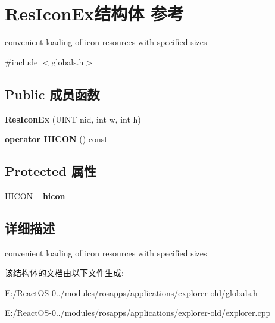 \hypertarget{struct_res_icon_ex}{}\section{Res\+Icon\+Ex结构体 参考}
\label{struct_res_icon_ex}


convenient loading of icon resources with specified sizes  




{\ttfamily \#include $<$globals.\+h$>$}

\subsection*{Public 成员函数}
\begin{DoxyCompactItemize}
\item 
\mbox{\label{struct_res_icon_ex_ac95a1940089c74b35853ab9e242a7ad2}} 
{\bfseries Res\+Icon\+Ex} (U\+I\+NT nid, int w, int h)
\item 
\mbox{\label{struct_res_icon_ex_ab31f198cd26556f03fb1fc600f46fc13}} 
{\bfseries operator H\+I\+C\+ON} () const
\end{DoxyCompactItemize}
\subsection*{Protected 属性}
\begin{DoxyCompactItemize}
\item 
\mbox{\label{struct_res_icon_ex_ab12ca56389f9d780749e4e1d7defa9af}} 
H\+I\+C\+ON {\bfseries \+\_\+hicon}
\end{DoxyCompactItemize}


\subsection{详细描述}
convenient loading of icon resources with specified sizes 

该结构体的文档由以下文件生成\+:\begin{DoxyCompactItemize}
\item 
E\+:/\+React\+O\+S-\/0../modules/rosapps/applications/explorer-\/old/globals.\+h\item 
E\+:/\+React\+O\+S-\/0../modules/rosapps/applications/explorer-\/old/explorer.\+cpp\end{DoxyCompactItemize}
